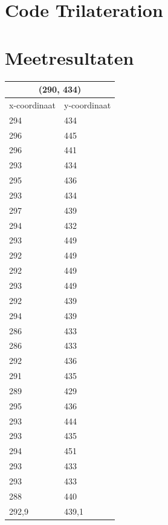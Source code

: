 \documentclass{article}
\begin{document}
\section{Code Trilateration}

\newpage

\section{Meetresultaten}
\begin{tabular}{ |l|l| }
  \hline
  \multicolumn{2}{|c|}{(290, 434)} \\
  \hline
  x-coordinaat & y-coordinaat \\ \hline
     294 & 434\\ \hline
     296 & 445\\ \hline
     296 & 441\\ \hline
     293 & 434\\ \hline
     295 & 436\\ \hline
     293 & 434\\ \hline
     297 & 439\\ \hline
     294 & 432\\ \hline
     293 & 449\\ \hline
     292 & 449\\ \hline
     292 & 449\\ \hline
     293 & 449\\ \hline
     292 & 439\\ \hline
     294 & 439\\ \hline
     286 & 433\\ \hline
     286 & 433\\ \hline
     292 & 436\\ \hline
     291 & 435\\ \hline
     289 & 429\\ \hline
     295 & 436\\ \hline
     293 & 444\\ \hline
     293 & 435\\ \hline
     294 & 451\\ \hline
     293 & 433\\ \hline
     293 & 433\\ \hline
     288 & 440\\ \hline\hline
     292,9 & 439,1 \\ \hline
\end{tabular}
\end{document}
